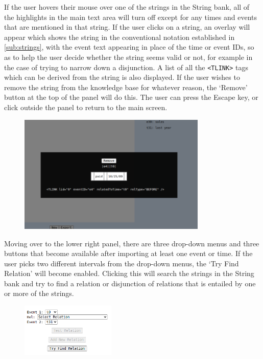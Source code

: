\documentclass[a4paper,12pt,leqno,twoside]{article}
\begin{document}
If the user hovers their mouse over one of the strings in the String bank, all of the highlights in the main text area will turn off except for any times and events that are mentioned in that string. If the user clicks on a string, an overlay will appear which shows the string in the conventional notation established in \cref{sub:strings}, with the event text appearing in place of the time or event IDs, so as to help the user decide whether the string seems valid or not, for example in the case of trying to narrow down a disjunction. A list of all the \verb|<TLINK>| tags which can be derived from the string is also displayed. If the user wishes to remove the string from the knowledge base for whatever reason, the `Remove' button at the top of the panel will do this. The user can press the Escape key, or click outside the panel to return to the main screen.
\begin{center}
	\begin{figure}[h!]
		\centering
		\includegraphics[width=0.8\textwidth]{images/START-clicked-string.png}
	\end{figure}
\end{center}
Moving over to the lower right panel, there are three drop-down menus and three buttons that become available after importing at least one event or time. If the user picks two different intervals from the drop-down menus, the `Try Find Relation' will become enabled. Clicking this will search the strings in the String bank and try to find a relation or disjunction of relations that is entailed by one or more of the strings.
\begin{center}
	\begin{figure}[h!]
		\centering
		\includegraphics[width=0.4\textwidth]{images/START-try-1.png}
	\end{figure}
\end{center}
\end{document}
